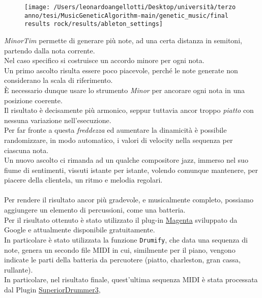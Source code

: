 \documentclass[a4paper,12pt]{report}
\begin{document}
\begin{figure}[H]
    \centering
    \texttt{[image: /Users/leonardoangellotti/Desktop/università/terzo anno/tesi/MusicGeneticAlgorithm-main/genetic\_music/final results rock/results/ableton\_settings]} 
    \label{fig:immagine12}
\end{figure}

\textit{MinorTim} permette di generare più note, ad una certa distanza in semitoni, partendo dalla nota corrente. \\
Nel caso specifico si costruisce un accordo minore per ogni nota. \\
Un primo ascolto risulta essere poco piacevole, perché le note generate non considerano la scala di riferimento. \\
È necessario dunque usare lo strumento \textit{Minor} per ancorare ogni nota in una posizione coerente. \\
Il risultato è decisamente più armonico, seppur tuttavia ancor troppo \textit{piatto} con nessuna variazione nell'esecuzione. \\
Per far fronte a questa \textit{freddezza} ed aumentare la dinamicità è possibile randomizzare, in modo automatico, i valori di velocity nella sequenza per ciascuna nota. \\
Un nuovo ascolto ci rimanda ad un qualche compositore jazz, immerso nel suo fiume di sentimenti, vissuti istante per istante, 
volendo comunque mantenere, per piacere della clientela, un ritmo e melodia regolari. \\
\\
Per rendere il risultato ancor più gradevole, e musicalmente completo, possiamo aggiungere un elemento di percussioni, come una batteria. \\
Per il risultato ottenuto è stato utilizzato il plug-in \href{https://magenta.tensorflow.org/studio}{Magenta}  sviluppato da Google e attualmente disponibile gratuitamente. \\
In particolare è stato utilizzata la funzione \texttt{Drumify}, che data una sequenza di note, genera un secondo file MIDI in cui, similmente per il piano, vengono indicate le parti della batteria da percuotere (piatto, charleston, gran cassa, rullante). \\
In particolare, nel risultato finale, quest'ultima sequenza MIDI è stata processata dal Plugin \href{https://www.toontrack.com/product/superior-drummer-3/?gad_source=1&gclid=Cj0KCQjws560BhCuARIsAHMqE0H2FsGI5sBj5JLtPNhhiKiLf9qMEccOntk8F9uc4_ZvSDPK5TCZZKUaAg1LEALw_wcB}{SuperiorDrummer3},
\end{document}
